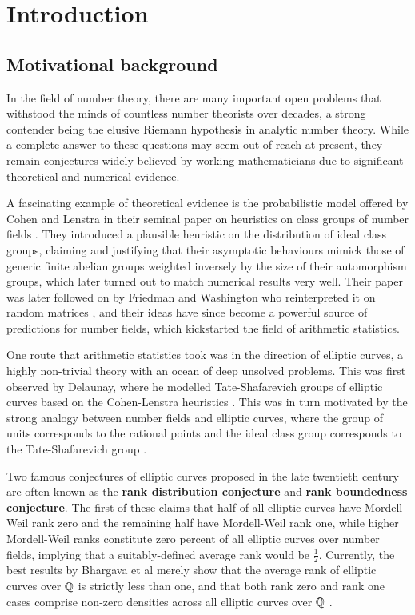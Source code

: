 \chapter{Introduction}

\section{Motivational background}

In the field of number theory, there are many important open problems that withstood the minds of countless number theorists over decades, a strong contender being the elusive Riemann hypothesis in analytic number theory. While a complete answer to these questions may seem out of reach at present, they remain conjectures widely believed by working mathematicians due to significant theoretical and numerical evidence.

A fascinating example of theoretical evidence is the probabilistic model offered by Cohen and Lenstra in their seminal paper on heuristics on class groups of number fields \cite{CL84}. They introduced a plausible heuristic on the distribution of ideal class groups, claiming and justifying that their asymptotic behaviours mimick those of generic finite abelian groups weighted inversely by the size of their automorphism groups, which later turned out to match numerical results very well. Their paper was later followed on by Friedman and Washington who reinterpreted it on random matrices \cite{FW89}, and their ideas have since become a powerful source of predictions for number fields, which kickstarted the field of arithmetic statistics.

One route that arithmetic statistics took was in the direction of elliptic curves, a highly non-trivial theory with an ocean of deep unsolved problems. This was first observed by Delaunay, where he modelled Tate-Shafarevich groups of elliptic curves based on the Cohen-Lenstra heuristics \cite{Del01}. This was in turn motivated by the strong analogy between number fields and elliptic curves, where the group of units corresponds to the rational points and the ideal class group corresponds to the Tate-Shafarevich group \cite{Del07}.

Two famous conjectures of elliptic curves proposed in the late twentieth century are often known as the \textbf{rank distribution conjecture} and \textbf{rank boundedness conjecture}. The first of these claims that half of all elliptic curves have Mordell-Weil rank zero and the remaining half have Mordell-Weil rank one, while higher Mordell-Weil ranks constitute zero percent of all elliptic curves over number fields, implying that a suitably-defined average rank would be $ \tfrac{1}{2} $. Currently, the best results by Bhargava et al merely show that the average rank of elliptic curves over $ \mathbb{Q} $ is strictly less than one, and that both rank zero and rank one cases comprise non-zero densities across all elliptic curves over $ \mathbb{Q} $ \cite{BS15a, BS15b}.

